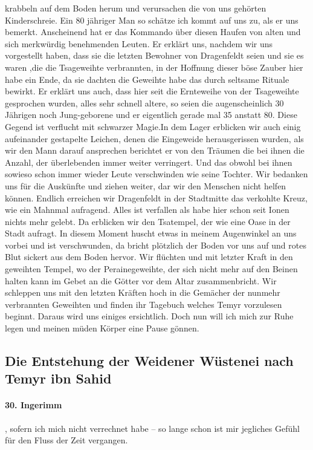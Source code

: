 \documentclass[11pt]{scrreprt}
\begin{document}
krabbeln auf dem Boden herum und verursachen die von uns gehörten Kinderschreie. Ein 80 jähriger Man so schätze ich kommt auf uns zu, als er uns bemerkt. Anscheinend hat er das Kommando über diesen Haufen von alten und sich merkwürdig benehmenden Leuten. Er erklärt uns, nachdem wir uns vorgestellt haben, dass sie die letzten Bewohner von Dragenfeldt   seien und sie es waren ,die die Tsageweihte verbrannten, in der Hoffnung dieser böse Zauber hier habe ein Ende, da sie dachten die Geweihte habe das durch seltsame Rituale bewirkt. Er erklärt uns auch, dass hier seit die Ernteweihe von der Tsageweihte gesprochen wurden, alles sehr schnell altere, so seien die augenscheinlich 30 Jährigen noch Jung-geborene und er eigentlich gerade mal 35 anstatt 80. Diese Gegend ist verflucht mit schwarzer Magie.In dem Lager erblicken wir auch einig aufeinander gestapelte Leichen, denen die Eingeweide herausgerissen wurden, als wir den Mann darauf ansprechen berichtet er von den Träumen die bei ihnen die Anzahl, der überlebenden immer weiter verringert. Und das obwohl bei ihnen sowieso schon immer wieder Leute verschwinden wie seine Tochter. Wir bedanken uns für die Auskünfte und ziehen weiter, dar wir den Menschen nicht helfen können. Endlich erreichen wir Dragenfeldt  in der Stadtmitte das verkohlte Kreuz, wie ein Mahnmal aufragend. Alles ist verfallen als habe hier schon seit Ionen nichts mehr gelebt. Da erblicken wir den Tsatempel, der wie eine Oase in der Stadt aufragt. In diesem Moment huscht etwas in meinem Augenwinkel an uns vorbei und ist verschwunden, da bricht plötzlich der Boden vor uns auf und rotes Blut sickert aus dem Boden hervor. Wir flüchten und mit letzter Kraft in den geweihten Tempel, wo der Perainegeweihte, der sich nicht mehr auf den Beinen halten kann im Gebet an die Götter vor dem Altar zusammenbricht. Wir schleppen uns mit den letzten Kräften hoch in die Gemächer der nunmehr verbrannten Geweihten und finden ihr Tagebuch welches Temyr vorzulesen beginnt. Daraus wird uns einiges ersichtlich. Doch nun will ich mich zur Ruhe legen und meinen müden Körper eine Pause gönnen.\par

\subsection{Die Entstehung der Weidener Wüstenei nach Temyr ibn Sahid}

\paragraph{30. Ingerimm}, sofern ich mich nicht verrechnet habe – so lange schon ist mir jegliches Gefühl für den Fluss der Zeit vergangen.\par
\end{document}
